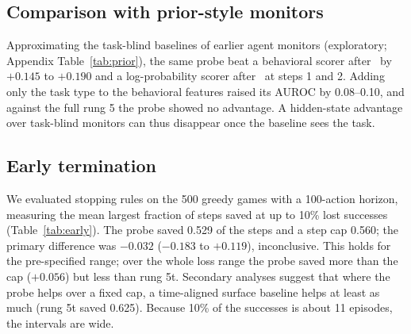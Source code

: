 \documentclass[10pt]{article}
\begin{document}
\subsection{Comparison with prior-style monitors}\label{sec:prior}
Approximating the task-blind baselines of earlier agent monitors (exploratory; Appendix Table~\ref{tab:prior}), the same probe beat a behavioral scorer after~\cite{ruan2026doomed} by $+0.145$ to $+0.190$ and a log-probability scorer after~\cite{pham2026agentstop} at steps 1 and 2.
Adding only the task type to the behavioral features raised its AUROC by 0.08--0.10, and against the full rung 5 the probe showed no advantage. A hidden-state advantage over task-blind monitors can thus disappear once the baseline sees the task.

\subsection{Early termination}
We evaluated stopping rules on the 500 greedy games with a 100-action horizon, measuring the mean largest fraction of steps saved at up to 10\% lost successes (Table~\ref{tab:early}). The probe saved 0.529 of the steps and a step cap 0.560; the primary difference was $-0.032$ ($-0.183$ to $+0.119$), inconclusive. This holds for the pre-specified range; over the whole loss range the probe saved more than the cap ($+0.056$) but less than rung 5t.
Secondary analyses suggest that where the probe helps over a fixed cap, a time-aligned surface baseline helps at least as much (rung 5t saved 0.625). Because 10\% of the successes is about 11 episodes, the intervals are wide.


\end{document}

